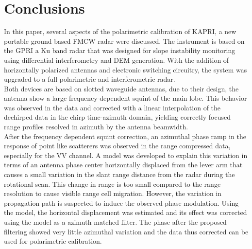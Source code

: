 \section{Conclusions}\label{sec:conclusions}
In this paper, several aspects of the polarimetric calibration of KAPRI, a new portable ground based FMCW radar were discussed. The instrument is
based on the GPRI\cite{werner_gpri_2012} a Ku band radar that was designed for slope instability monitoring using differential interferometry and DEM generation. With the addition of horizontally polarized antennas and electronic switching circuitry, the system was upgraded to a full polarimetric and interferometric radar.\\ Both  devices are based on slotted waveguide antennas, due to their design, the antenna show a large frequency-dependent squint of the main lobe. This behavior was observed in the data and corrected with a linear interpolation of the dechirped data in the chirp time-azimuth domain, yielding correctly focused range profiles resolved in azimuth by the antenna beamwidth.\\
After the frequency dependent squint correction, an azimuthal phase ramp in the response of point like scatterers was observed in the range compressed data, especially for the VV channel. A model was developed to explain this variation in terms of an antenna phase center horizontally displaced from the lever arm that causes a small variation in the slant range distance from the radar during the rotational scan. This change in range is too small compared to the range resolution to cause visible range cell migration. However, the variation in propagation path is suspected to induce the observed phase modulation. Using the model, the horizontal displacement was estimated and its effect was corrected using the model as a azimuth matched filter. The phase after the proposed filtering showed very little azimuthal variation and the data thus corrected can be used for polarimetric calibration.\\

